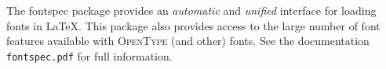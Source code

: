 \documentclass{article}
\begin{document}
The \textsf{fontspec} package provides an \emph{automatic} and \emph{unified} interface for loading
fonts in \LaTeX. This package also provides access to the large number of font features available
with \textsc{OpenType} (and other) fonts. See the documentation \texttt{fontspec.pdf} for full
information.
\end{document}
